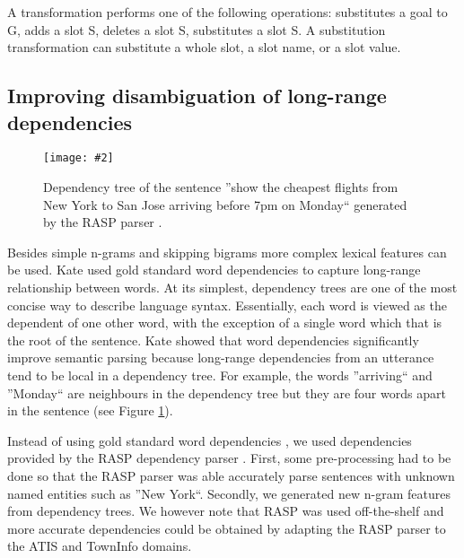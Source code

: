 \documentclass{article}
\newcommand{\citep}[1]{\cite{#1}}
\newcommand{\fgrparam}[4]{
  \begin{figure}[htbp]
    \begin{center}
      \leavevmode
      \texttt{[image: \#2]}
    \end{center}
    \vspace{-0.5cm}
    \caption{#4}
    \label{#3}
  \end{figure}
}
\begin{document}
A transformation performs one of the following operations: substitutes a goal to G, adds a slot S, deletes a slot S, substitutes a slot S. A substitution transformation can substitute a whole slot, a slot name, 
or a slot value.

\subsection{Improving disambiguation of long-range dependencies}
\label{sec:dep:trees}

\fgrparam{width=5.5cm}{./fig/dep-tree.pdf}{fig:dep:tree}{Dependency tree of the sentence ''show the cheapest flights from New York to San Jose arriving before 7pm on Monday`` generated by the RASP parser \cite{rasp06}.}

Besides simple n-grams and skipping bigrams more complex lexical features can be used. Kate \citep{kate08} used gold standard word dependencies to capture long-range relationship between words. At its simplest, dependency trees are one of the most concise way to describe language syntax. Essentially, each word is viewed as the dependent of one other word, with the exception of a single word which that is the root of the sentence. Kate showed that word dependencies significantly improve semantic parsing because long-range dependencies from an utterance tend to be local in a dependency tree. For example, the words ''arriving`` and ''Monday`` are neighbours in the dependency tree but they are four words apart in the sentence (see Figure \ref{fig:dep:tree}).

Instead of using gold standard word dependencies \cite{kate08}, we used dependencies provided by the RASP dependency parser \cite{rasp06}. First, some pre-processing had to be done so that the RASP parser was able accurately parse sentences with unknown named entities such as ''New York``. 
Secondly, we generated new n-gram features from dependency trees. 
We however note that RASP was used off-the-shelf and more accurate dependencies could be obtained by adapting the RASP parser to the ATIS and TownInfo domains.
\end{document}
